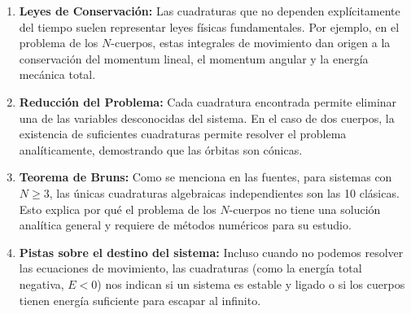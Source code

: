 \documentclass[a4paper]{article}
\begin{document}
\begin{enumerate}
    \item \textbf{Leyes de Conservación:} Las cuadraturas que no dependen explícitamente del tiempo suelen representar leyes físicas fundamentales. Por ejemplo, en el problema de los $N$-cuerpos, estas integrales de movimiento dan origen a la conservación del momentum lineal, el momentum angular y la energía mecánica total.
    \item \textbf{Reducción del Problema:} Cada cuadratura encontrada permite eliminar una de las variables desconocidas del sistema. En el caso de dos cuerpos, la existencia de suficientes cuadraturas permite resolver el problema analíticamente, demostrando que las órbitas son cónicas.
    \item \textbf{Teorema de Bruns:} Como se menciona en las fuentes, para sistemas con $N \geq 3$, las únicas cuadraturas algebraicas independientes son las 10 clásicas. Esto explica por qué el problema de los $N$-cuerpos no tiene una solución analítica general y requiere de métodos numéricos para su estudio.
    \item \textbf{Pistas sobre el destino del sistema:} Incluso cuando no podemos resolver las ecuaciones de movimiento, las cuadraturas (como la energía total negativa, $E < 0$) nos indican si un sistema es estable y ligado o si los cuerpos tienen energía suficiente para escapar al infinito.
\end{enumerate}




 
\end{document}
